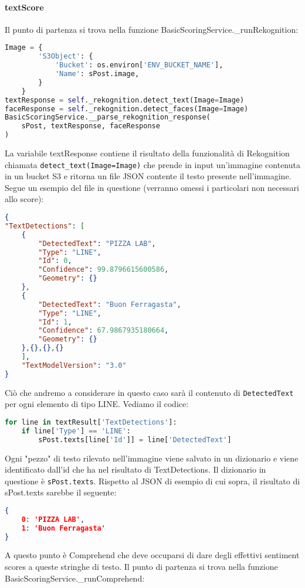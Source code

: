 \paragraph{textScore}
Il punto di partenza si trova nella funzione BasicScoringService.\_runRekognition:
\begin{lstlisting}[language=Python]
Image = {
        'S3Object': {
            'Bucket': os.environ['ENV_BUCKET_NAME'],
            'Name': sPost.image,
        }
    }
textResponse = self._rekognition.detect_text(Image=Image)
faceResponse = self._rekognition.detect_faces(Image=Image)
BasicScoringService.__parse_rekognition_response(
    sPost, textResponse, faceResponse
)
\end{lstlisting}
La variabile textResponse contiene il risultato della funzionalità
di Rekognition chiamata \verb+detect_text(Image=Image)+ che prende in input un'immagine contenuta
in un bucket S3 e ritorna un file JSON contente il testo presente nell'immagine.
Segue un esempio del file in questione (verranno omessi i particolari non necessari allo score):
\begin{lstlisting}[language=JSON]
{
"TextDetections": [
    {
        "DetectedText": "PIZZA LAB",
        "Type": "LINE",
        "Id": 0,
        "Confidence": 99.8796615600586,
        "Geometry": {}
    },
    {
        "DetectedText": "Buon Ferragasta",
        "Type": "LINE",
        "Id": 1,
        "Confidence": 67.9867935180664,
        "Geometry": {}
    },{},{},{}
    ],
    "TextModelVersion": "3.0"
}        
\end{lstlisting}
Ciò che andremo a considerare in questo caso sarà il contenuto di \verb+DetectedText+
per ogni elemento di tipo LINE. 
Vediamo il codice: 
\begin{lstlisting}[language=Python]
for line in textResult['TextDetections']:
    if line['Type'] == 'LINE':
        sPost.texts[line['Id']] = line['DetectedText']
\end{lstlisting}
Ogni "pezzo" di testo rilevato nell'immagine viene salvato in un dizionario e viene
identificato dall'id che ha nel risultato di TextDetections. Il dizionario in
questione è \verb+sPost.texts+.
Rispetto al JSON di esempio di cui sopra, il risultato di sPost.texts sarebbe il seguente:
\begin{lstlisting}[language=JSON]
{
    0: 'PIZZA LAB', 
    1: 'Buon Ferragasta'
}
\end{lstlisting}
A questo punto è Comprehend che deve occuparsi di dare degli effettivi sentiment
scores a queste stringhe di testo.
Il punto di partenza si trova nella funzione BasicScoringService.\_runComprehend:
